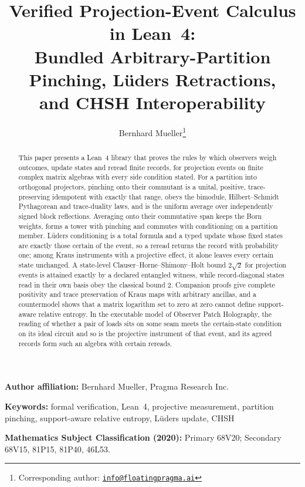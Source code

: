 \documentclass[11pt]{article}
\title{\textbf{Verified Projection-Event Calculus in Lean~4:\\
Bundled Arbitrary-Partition Pinching, L\"uders Retractions,\\
and CHSH Interoperability}}
\author{Bernhard Mueller\thanks{Corresponding author:
\href{mailto:info@floatingpragma.ai}{\texttt{info@floatingpragma.ai}}}}
\date{\OPHPaperReleaseDate}
\renewcommand{\_}{\textunderscore\allowbreak}
\theoremstyle{remark}
\begin{document}
\maketitle
\OPHPaperReleaseBanner

\begin{center}
\small\textbf{Author affiliation:} Bernhard Mueller, Pragma Research Inc.
\end{center}

\begin{abstract}
This paper presents a Lean~4 library that proves the rules by which
observers weigh outcomes, update states and reread finite records, for
projection events on finite complex matrix algebras with every side
condition stated. For a partition into
orthogonal projectors, pinching onto their commutant is a unital, positive,
trace-preserving idempotent with exactly that range, obeys the bimodule,
Hilbert--Schmidt Pythagorean and trace-duality laws, and is the uniform
average over independently signed block reflections. Averaging onto their
commutative span keeps the Born weights, forms a tower with pinching and
commutes with conditioning on a partition member. L\"uders conditioning is a
total formula and a typed update whose fixed states are exactly those
certain of the event, so a reread returns the record with probability one;
among Kraus instruments with a projective effect, it alone leaves every
certain state unchanged. A state-level Clauser--Horne--Shimony--Holt bound
$2\sqrt2$ for projection events is attained exactly by a declared entangled
witness, while record-diagonal states read in their own basis obey the
classical bound $2$. Companion proofs give complete positivity and trace
preservation of Kraus maps with arbitrary ancillas, and a countermodel shows
that a matrix logarithm set to zero at zero cannot define support-aware
relative entropy.
In the executable model of Observer Patch Holography, the reading of whether
a pair of loads sits on some seam meets the certain-state condition on its
ideal circuit and so is the projective instrument of that event, and its
agreed records form such an algebra with certain rereads.
\end{abstract}

\noindent\textbf{Keywords:} formal verification, Lean~4, projective measurement,
partition pinching, support-aware relative entropy, L\"uders update, CHSH

\medskip
\noindent\textbf{Mathematics Subject Classification (2020):}
Primary 68V20; Secondary 68V15, 81P15, 81P40, 46L53.
\end{document}
